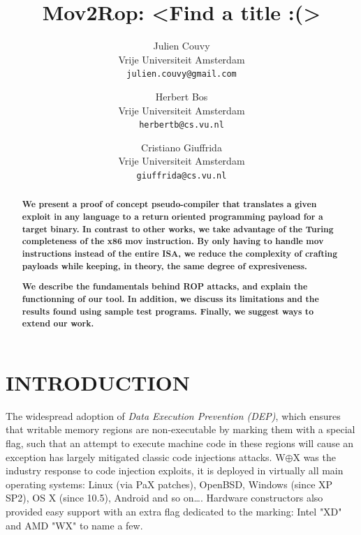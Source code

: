 \documentclass[10pt,twocolumn]{article}
\begin{document}
\author{
        Julien Couvy\\
        Vrije Universiteit Amsterdam\\
        \texttt{julien.couvy@gmail.com}
        \and
        Herbert Bos\\
        Vrije Universiteit Amsterdam\\
        \texttt{herbertb@cs.vu.nl}
        \and
        Cristiano Giuffrida\\
        Vrije Universiteit Amsterdam\\
        \texttt{giuffrida@cs.vu.nl}
}
\title{\Huge Mov2Rop: <Find a title :(>\vspace{.75em}}
\maketitle

\begin{abstract}

  \textbf{We present a proof of concept pseudo-compiler that translates a given
    exploit in any language to a return oriented programming payload for a
    target binary. In contrast to other works, we take advantage of the Turing
    completeness of the x86 mov instruction. By only having to handle mov
    instructions instead of the entire ISA, we reduce the complexity of crafting
  payloads while keeping, in theory, the same degree of expresiveness.}

  \textbf{We describe the fundamentals behind ROP attacks, and explain the
    functionning of our tool. In addition, we discuss its limitations and the
    results found using  sample test programs. Finally, we suggest ways to extend
  our work.}

\end{abstract}

\section{INTRODUCTION}

The widespread adoption of \textit{Data Execution Prevention (DEP)}, which
ensures that writable memory regions are non-executable by marking them with a
special flag, such that an attempt to execute machine code in these regions
will cause an exception has largely mitigated classic code injections attacks.
W$\oplus$X was the industry response to code injection exploits, it is deployed
in virtually all main operating systems: Linux (via PaX patches), OpenBSD,
Windows (since XP SP2), OS X (since 10.5), Android and so on\ldots. Hardware
constructors also provided easy support with an extra flag dedicated to the
marking: Intel "XD" and AMD "WX" to name a few.
\end{document}
